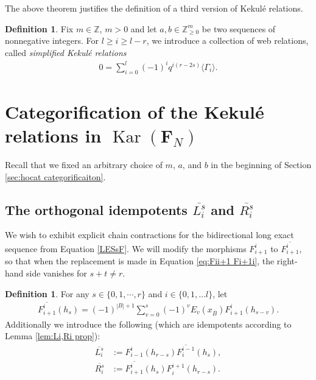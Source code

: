 \documentclass[12pt]{amsart}
\theoremstyle{definition}
\newtheorem{definition}[theorem]{Definition}
\theoremstyle{remark}
\numberwithin{equation}{section}
\numberwithin{figure}{section}
\newcommand{\Z}{\mathbb{Z}}
\newcommand{\Kar}{\operatorname{Kar}}
\newcommand{\Li}[2]{\overline{L^{#1}_{#2}}}
\newcommand{\Ri}[2]{\overline{R^{#1}_{#2}}}
\newcommand{\Foam}{\mathbf{F}_N}
\begin{document}
The above theorem justifies the definition of a third version of Kekulé relations.

\begin{definition}\label{def:simplified kekule}
    Fix $m \in \Z$, $m > 0$ and let $a,b \in \Z_{\geq 0}^m$ be two sequences of nonnegative integers. For $l \geq i \geq l - r$, we introduce a collection of web relations, called \emph{simplified Kekulé relations}
\begin{align}\label{eq:true kekuleThree}
0 = \sum_{i=0}^l(-1)^iq^{i(r-2s)}\langle\Gamma_i\rangle.
\end{align}
\end{definition}

\section{Categorification of the Kekulé relations in $\Kar(\Foam)$}\label{sec:kar categorification}

Recall that we fixed an arbitrary choice of $m$, $a$, and $b$ in the beginning of Section \ref{sec:hocat categorificaiton}.

\subsection{The orthogonal idempotents $\Li{s}{i}$ and $\Ri{s}{i}$}
We wish to exhibit explicit chain contractions for the bidirectional long exact sequence from Equation \eqref{LESsF}. We will modify the morphisms $F_{i+1}^i$ to $\overline{F_{i+1}^i}$, so that when the replacement is made in Equation \eqref{eq:Fii+1 Fi+1i}, the right-hand side vanishes for $s+t\neq r$.


\begin{definition}\label{def:Li,Ri}
    For any $s\in \{0,1,\cdots, r\}$ and $i \in \{0,1, \ldots l\}$, let
    \begin{align*}
        \overline{F_{i+1}^i} (h_s)= (-1)^{|B| + 1}\sum_{v = 0}^s(-1)^v E_v(x_{\overline{B}}) F_{i+1}^i(h_{s-v}).
    \end{align*}
    Additionally we introduce the following (which are idempotents according to Lemma \ref{lem:Li,Ri prop}):
    \begin{align*}
        \Li{s}{i} &:= F_{i-1}^i(h_{r-s} )\overline{F_{i}^{i-1}}(h_s), \\
        \Ri{s}{i} &:= \overline{F_{i+1}^i} (h_s)F_{i}^{i+1} (h_{r-s}).
    \end{align*}
\end{definition}
\end{document}
